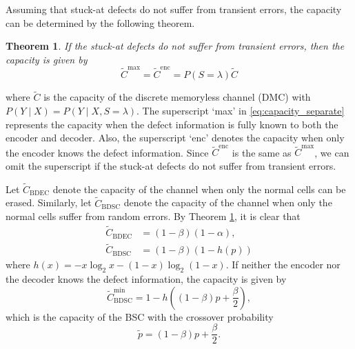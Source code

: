 \documentclass[10pt,twocolumn,twoside,submit]{JCNtran}
\newtheorem{theorem}{Theorem}
\begin{document}
	Assuming that stuck-at defects do not suffer from transient errors, the capacity can be determined by the following theorem. 	
	\begin{theorem}\cite{Heegard1983capacity}\label{thm:capacity_separate}
		If the stuck-at defects do not suffer from transient errors, then the capacity is given by
		\begin{equation} \label{eq:capacity_separate}
			\widetilde{C}^{\text{max}} = \widetilde{C}^{\text{enc}} = P(S = \lambda)\widetilde{C}
		\end{equation}
	\end{theorem}
	where $\widetilde{C}$ is the capacity of the discrete memoryless channel (DMC) with $P(Y \mid X) = P(Y \mid X, S = \lambda)$. The superscript `max' in \eqref{eq:capacity_separate} represents the capacity when the defect information is fully known to both the encoder and decoder. Also, the superscript `enc' denotes the capacity when only the encoder knows the defect information. Since $\widetilde{C}^{\text{enc}}$ is the same as $\widetilde{C}^{\text{max}}$, we can omit the superscript if the stuck-at defects do not suffer from transient errors. 
	
	Let $\widetilde{C}_{\text{BDEC}}$ denote the capacity of the channel when only the normal cells can be erased. Similarly, let $\widetilde{C}_{\text{BDSC}}$ denote the capacity of the channel when only the normal cells suffer from random errors. By Theorem \ref{thm:capacity_separate}, it is clear that
	\begin{align}
		\widetilde{C}_{\text{BDEC}} & = (1-\beta)(1-\alpha), \label{eq:capacity_BDEC_tilde} \\
		\widetilde{C}_{\text{BDSC}} & = (1-\beta)(1-h(p)) \label{eq:capacity_BDSC_tilde}
	\end{align}
	where $h\left( x\right) = -x \log_2 x - \left(1-x\right) \log_2\left(1-x\right)$. If neither the encoder nor the decoder knows the defect information, the capacity is given by~\cite{Heegard1983capacity}
	\begin{equation} \label{eq:capacity_BDSC_tilde_min}
		\widetilde{C}_{\text{BDSC}}^{\text{min}} = 1-h\left((1-\beta)p + \frac{\beta}{2} \right),
	\end{equation}	
	which is the capacity of the BSC with the crossover probability 
	\begin{equation}\label{eq:p_tilde}
	\widetilde{p} = (1-\beta)p + \frac{\beta}{2}.
	\end{equation}			
	
\end{document}

